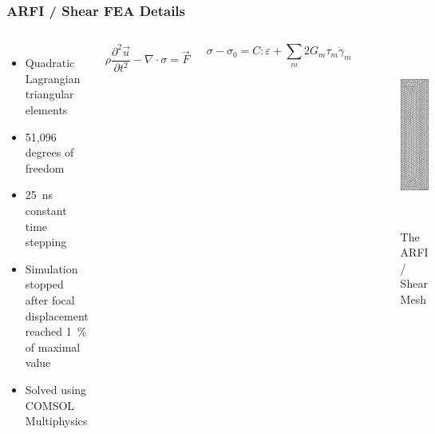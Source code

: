 \documentclass{beamer}
\newcommand{\percent}{\%}
\begin{document}
		\begin{frame}[label=arfiFEA]
			\frametitle{ARFI / Shear FEA Details}
			\begin{columns}[c]
					\begin{itemize}
						\item Quadratic Lagrangian triangular elements
						\item 51,096 degrees of freedom
						\item \SI{25}{\ns} constant time stepping
						\item Simulation stopped after focal displacement reached \SI{1}{\percent} of maximal value
						\item Solved using COMSOL Multiphysics
					\end{itemize}

					\begin{equation*}
						\rho \frac{\partial^2\vec{u}}{\partial t^2} - \nabla\cdot\sigma = \vec{F}
					\end{equation*}

					\begin{equation*}
						\sigma - \sigma_0 = C:\varepsilon + \sum_m 2 G_m \tau_m \dot{\gamma}_m
					\end{equation*}

					\begin{figure}
						\includegraphics[height=6cm]{assets/arfi/mesh.png}
						\caption{The ARFI / Shear Mesh}
					\end{figure}
			\end{columns}
		\end{frame}
\end{document}
